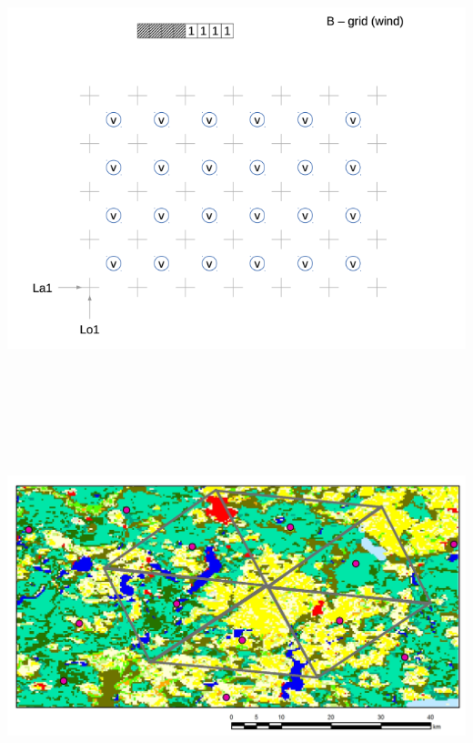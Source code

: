 {}\includegraphics[width=6.49931in,height=4.83611in]{../tex/extracted-media/media/image3.png}\includegraphics[width=6.49931in,height=4.86111in]{../tex/extracted-media/media/image4.png}\textbf{\\
}
